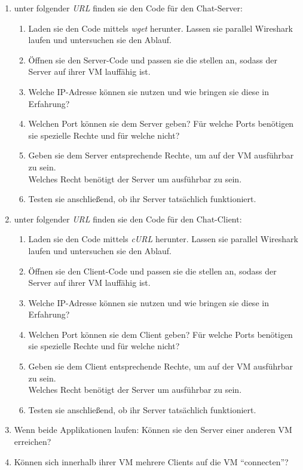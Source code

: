 \documentclass[paper=a4,fontsize=11pt]{scrartcl}%
\numberwithin{equation}{section}
\begin{document}
\begin{enumerate}
	\item unter folgender \emph{URL} finden sie den Code für den Chat-Server:
	\begin{enumerate}
		\item Laden sie den Code mittels \emph{wget} herunter. Lassen sie parallel Wireshark laufen und untersuchen sie den Ablauf.
		\item Öffnen sie den Server-Code und passen sie die stellen an, sodass der Server auf ihrer VM lauffähig ist.
		\item Welche IP-Adresse können sie nutzen und wie bringen sie diese in Erfahrung?
		\item Welchen Port können sie dem Server geben? Für welche Ports benötigen sie spezielle Rechte und für welche nicht?
		\item Geben sie dem Server entsprechende Rechte, um auf der VM ausführbar zu sein.\\
		Welches Recht benötigt der Server um ausführbar zu sein.
		\item Testen sie anschließend, ob ihr Server tatsächlich funktioniert.
	\end{enumerate}
	\item unter folgender \emph{URL} finden sie den Code für den Chat-Client:
	\begin{enumerate}
		\item Laden sie den Code mittels \emph{cURL} herunter. Lassen sie parallel Wireshark laufen und untersuchen sie den Ablauf.
		\item Öffnen sie den Client-Code und passen sie die stellen an, sodass der Server auf ihrer VM lauffähig ist.
		\item Welche IP-Adresse können sie nutzen und wie bringen sie diese in Erfahrung?
		\item Welchen Port können sie dem Client geben? Für welche Ports benötigen sie spezielle Rechte und für welche nicht?
		\item Geben sie dem Client entsprechende Rechte, um auf der VM ausführbar zu sein.\\
		Welches Recht benötigt der Server um ausführbar zu sein.
		\item Testen sie anschließend, ob ihr Server tatsächlich funktioniert.
	\end{enumerate}
	\item Wenn beide Applikationen laufen: Können sie den Server einer anderen VM erreichen? 
	\item Können sich innerhalb ihrer VM mehrere Clients auf die VM \enquote{connecten}?
\end{enumerate}
\end{document}
